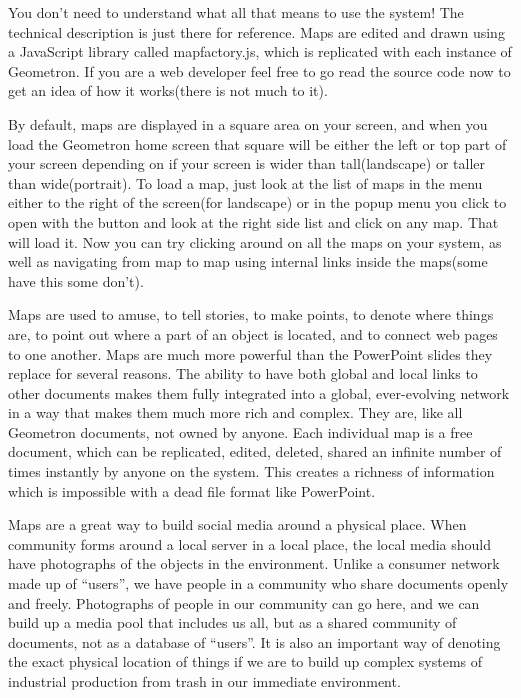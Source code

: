 You don't need to understand what all that means to use the system! The technical description is just there for reference.  Maps are edited and drawn using a JavaScript library called mapfactory.js, which is replicated with each instance of Geometron.  If you are a web developer feel free to go read the source code now to get an idea of how it works(there is not much to it).

By default, maps are displayed in a square area on your screen, and when you load the Geometron home screen that square will be either the left or top part of your screen depending on if your screen is wider than tall(landscape) or taller than wide(portrait).  To load a map, just look at the list of maps in the menu either to the right of the screen(for landscape) or in the popup menu you click to open with the button and look at the right side list and click on any map.  That will load it.  Now you can try clicking around on all the maps on your system, as well as navigating from map to map using internal links inside the maps(some have this some don't). 

Maps are used to amuse, to tell stories, to make points, to denote where things are, to point out where a part of an object is located, and to connect web pages to one another.  Maps are much more powerful than the PowerPoint slides they replace for several reasons. The ability to have both global and local links to other documents makes them fully integrated into a global, ever-evolving network in a way that makes them much more rich and complex.  They are, like all Geometron documents, not owned by anyone.  Each individual map is a free document, which can be replicated, edited, deleted, shared an infinite number of times instantly by anyone on the system.  This creates a richness of information which is impossible with a dead file format like PowerPoint.  

Maps are a great way to build social media around a physical place.  When community forms around a local server in a local place, the local media should have photographs of the objects in the environment.  Unlike a consumer network made up of ``users'', we have people in a community who share documents openly and freely.  Photographs of people in our community can go here, and we can build up a media pool that includes us all, but as a shared community of documents, not as a database of ``users''.  It is also an important way of denoting the exact physical location of things if we are to build up complex systems of industrial production from trash in our immediate environment.  

